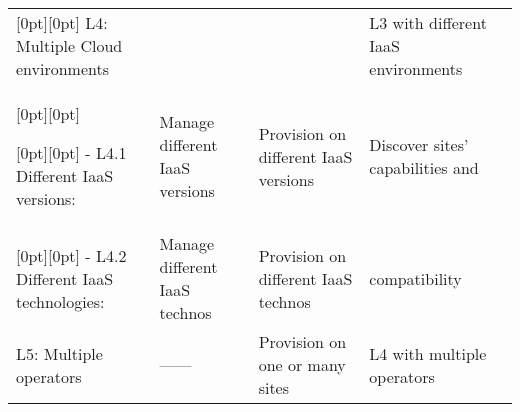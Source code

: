 \begin{tabular}{@{} l L L L @{} >{\kern\tabcolsep}l @{}}
    [0pt][0pt]
    L4: Multiple Cloud environments &
    &
    &
    L3 with different IaaS environments\\

    [0pt][0pt]

    [0pt][0pt]
    - L4.1 Different IaaS versions:&
    Manage different IaaS versions&
    Provision on different IaaS versions&
    Discover sites' capabilities and\\
    
    [0pt][0pt]
    - L4.2 Different IaaS technologies:&
    Manage different IaaS technos&
    Provision on different IaaS technos&
    compatibility\\

    L5: Multiple operators &
    \hfill ------ \hfill &
    Provision on one or many sites&
    L4 with multiple operators\\ 

    \bottomrule

\end{tabular}

